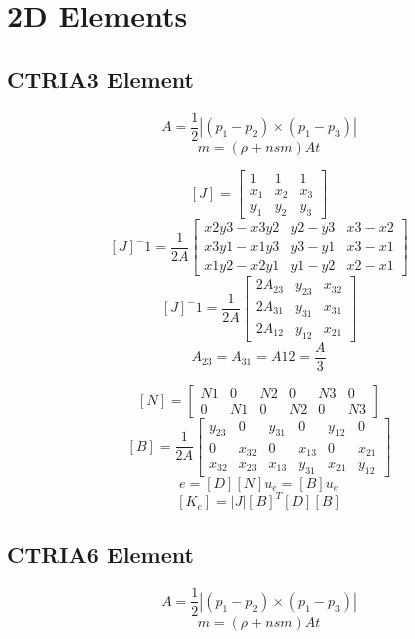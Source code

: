 \section{2D Elements}
   \subsection{CTRIA3 Element}
     \[ A = \frac{1}{2} |(p_1-p_2) \times (p_1-p_3)| \]
     \[ m = (\rho +nsm) A t \]

     \[ [J] = \left[ \begin{array}{ccc}
               1 &     1 & 1   \\
               x_1 & x_2 & x_3 \\
               y_1 & y_2 & y_3
            \end{array}\right]\]
     \[ [J]^-1 = \frac{1}{2A} \left[ \begin{array}{ccc}
               x2y3-x3y2 & y2-y3 & x3-x2 \\
               x3y1-x1y3 & y3-y1 & x3-x1 \\
               x1y2-x2y1 & y1-y2 & x2-x1
            \end{array}\right]\]
     \[ [J]^-1 = \frac{1}{2A} \left[ \begin{array}{ccc}
               2A_{23} & y_{23} & x_{32} \\
               2A_{31} & y_{31} & x_{31} \\
               2A_{12} & y_{12} & x_{21}
            \end{array}\right]\]
     \[ A_{23} = A_{31} = A{12} = \frac{A}{3} \]

     \[ [N] = \left[ \begin{array}{cccccc}
               N1 &  0 & N2 &  0 & N3 & 0  \\
               0  & N1 &  0 & N2 &  0 & N3
            \end{array}\right]\]
     \[ [B] = \frac{1}{2A} \left[ \begin{array}{cccccc}
               y_{23} &      0 & y_{31} &   0    & y_{12} &   0    \\
               0      & x_{32} &      0 & x_{13} &   0    & x_{21} \\
               x_{32} & x_{23} & x_{13} & y_{31} & x_{21} & y_{12}
            \end{array}\right]\]
     \[ e=[D] [N] u_e = [B] u_e    \]
     \[  [K_e] = |J| [B]^T [D] [B] \]

   \subsection{CTRIA6 Element}
     \[ A = \frac{1}{2} |(p_1-p_2) \times (p_1-p_3)| \]
     \[ m = (\rho +nsm) A t \]

